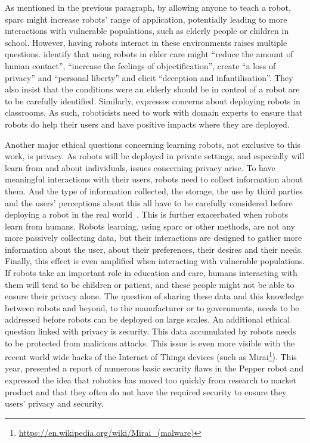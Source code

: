 As mentioned in the previous paragraph, by allowing anyone to teach a robot, \gls{sparc} might increase robots' range of application, potentially leading to more interactions with vulnerable populations, such as elderly people or children in school. However, having robots interact in these environments raises multiple questions. \cite{sharkey2012granny} identify that using robots in elder care might ``reduce the amount of human contact'', ``increase the feelings of objectification'', create ``a loss of privacy'' and ``personal liberty'' and elicit ``deception and infantilisation''. They also insist that the conditions were an elderly should be in control of a robot are to be carefully identified. Similarly, \cite{sharkey2016should} expresses concerns about deploying robots in classrooms. As such, roboticists need to work with domain experts to ensure that robots do help their users and have positive impacts where they are deployed.

Another major ethical questions concerning learning robots, not exclusive to this work, is privacy. As robots will be deployed in private settings, and especially will learn from and about individuals, issues concerning privacy arise. To have meaningful interactions with their users, robots need to collect information about them. And the type of information collected, the storage, the use by third parties and the users' perceptions about this all have to be carefully considered before deploying a robot in the real world~\citep{syrdal2007he}. This  is further exacerbated when robots learn from humans. Robots learning, using \gls{sparc} or other methods, are not any more passively collecting data, but their interactions are designed to gather more information about the user, about their preferences, their desires and their needs. Finally, this effect is even amplified when interacting with vulnerable populations. If robots take an important role in education and care, humans interacting with them will tend to be children or patient, and these people might not be able to ensure their privacy alone. The question of sharing these data and this knowledge between robots and beyond, to the manufacturer or to  governments, needs to be addressed before robots can be deployed on large scales. An additional ethical question linked with privacy is security. This data accumulated by robots needs to be protected from malicious attacks. This issue is even more visible with the recent world wide hacks of the Internet of Things devices (such as Mirai\footnote{\url{https://en.wikipedia.org/wiki/Mirai_(malware)}}). This year, \cite{giaretta2018adding} presented a report of numerous basic security flaws in the Pepper robot and expressed the idea that robotics has moved too quickly from research to market product and that they often do not have the required security to ensure they users' privacy and security.

